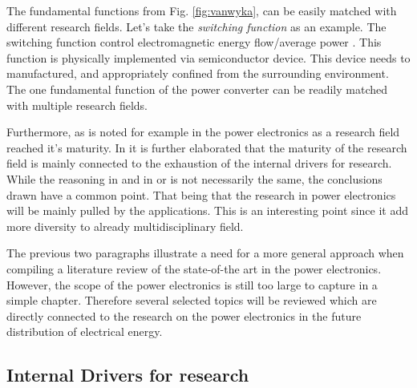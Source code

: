 \documentclass[]{scrartcl}
\begin{document}
The fundamental functions from Fig. \ref{fig:vanwyka}, can be easily matched with different research fields. Let's take the \emph{switching function} as an example. The switching function control electromagnetic energy flow/average power \cite{Ferreira2001}. This function is physically implemented via semiconductor device. This device needs to manufactured, and appropriately confined from the surrounding environment. The one fundamental function of the power converter can be readily matched with multiple research fields.

Furthermore, as is noted for example in \cite{Kolar2010} the power electronics as a research field reached it's maturity. In \cite{VanWyk2013} it is further elaborated that the maturity of the research field is mainly connected to the exhaustion of the internal drivers for research. While the reasoning in \cite{Kolar2010} and in \cite{Wyk2012} or \cite{Boroyevich2013} is not necessarily the same, the conclusions drawn have a common point. That being that the research in power electronics will be mainly pulled by the applications. This is an interesting point since it add more diversity to already multidisciplinary field. 


The previous two paragraphs illustrate a need for a more general approach when compiling a literature review of the state-of-the art in the power electronics. However, the scope of the power electronics is still too large to capture in a simple chapter. Therefore several selected topics will be reviewed which are directly connected to the research  on the power electronics in the future distribution of electrical energy. 


\subsection{Internal Drivers for research}
\end{document}
